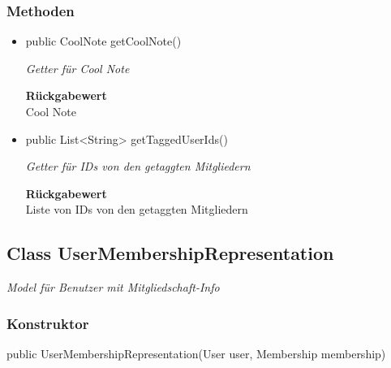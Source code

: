 \documentclass[a4paper]{scrreprt}
\begin{document}
        \subsubsection{Methoden}
        \begin{itemize}
        	\item{public CoolNote getCoolNote()}
        	
        	\textit{Getter für Cool Note}
        	
        	
        	
        	\textbf{Rückgabewert} \\
        	Cool Note        \item{public List<String> getTaggedUserIds()}
        	
        	\textit{Getter für IDs von den getaggten Mitgliedern}
        	
        	
        	
        	\textbf{Rückgabewert} \\
        	Liste von IDs von den getaggten Mitgliedern
        \end{itemize}
        \subsection{Class UserMembershipRepresentation}
        \textit{Model für Benutzer mit Mitgliedschaft-Info}
        \subsubsection{Konstruktor}
        public UserMembershipRepresentation(User user, Membership membership)
\end{document}
